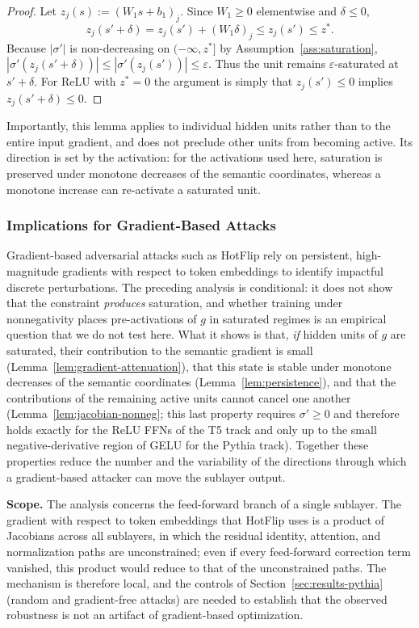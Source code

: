 \documentclass{article}
\theoremstyle{plain}
\theoremstyle{definition}
\theoremstyle{remark}
\theoremstyle{plain}
\begin{document}
\label{prf:persis}
\begin{proof}
Let $z_j(s) := (W_1 s + b_1)_j$. Since $W_1\ge 0$ elementwise and $\delta\le 0$,
\[
z_j(s' + \delta) = z_j(s') + (W_1 \delta)_j \le z_j(s') \le z^\ast .
\]
Because $|\sigma'|$ is non-decreasing on $(-\infty, z^\ast]$ by
Assumption~\ref{ass:saturation}, $|\sigma'(z_j(s'+\delta))| \le |\sigma'(z_j(s'))|
\le \varepsilon$. Thus the unit remains $\varepsilon$-saturated at $s'+\delta$.
For ReLU with $z^\ast = 0$ the argument is simply that $z_j(s') \le 0$ implies
$z_j(s'+\delta) \le 0$.
\end{proof}

Importantly, this lemma applies to individual hidden units rather than to the
entire input gradient, and does not preclude other units from becoming active.
Its
direction is set by the activation: for the activations used here, saturation is
preserved under monotone decreases of the semantic coordinates, whereas a monotone
increase can re-activate a saturated unit.
\subsubsection{Implications for Gradient-Based Attacks}

Gradient-based adversarial attacks such as HotFlip rely on persistent,
high-magnitude gradients with respect to token embeddings to identify impactful
discrete perturbations. The preceding analysis is conditional: it does not show
that the constraint \emph{produces} saturation, and whether training under
nonnegativity places pre-activations of $g$ in saturated regimes is an empirical
question that we do not test here. What it shows is that, \emph{if} hidden units
of $g$ are saturated, their contribution to the semantic gradient is small
(Lemma~\ref{lem:gradient-attenuation}), that this state is stable under monotone
decreases of the semantic coordinates (Lemma~\ref{lem:persistence}), and that the
contributions of the remaining active units cannot cancel one another
(Lemma~\ref{lem:jacobian-nonneg}; this last property requires $\sigma' \ge 0$ and
therefore holds exactly for the ReLU FFNs of the T5 track and only up to the small
negative-derivative region of GELU for the Pythia track). Together these properties
reduce the number and the variability of the directions through which a
gradient-based attacker can move the sublayer output.

\textbf{Scope.} The analysis concerns the feed-forward branch of a single sublayer.
The gradient with respect to token embeddings that HotFlip uses is a product of
Jacobians across all sublayers, in which the residual identity, attention, and
normalization paths are unconstrained; even if every feed-forward correction term
vanished, this product would reduce to that of the unconstrained paths. The
mechanism is therefore local, and the controls of Section~\ref{sec:results-pythia}
(random and gradient-free attacks) are needed to establish that the observed
robustness is not an artifact of gradient-based optimization.
\end{document}
